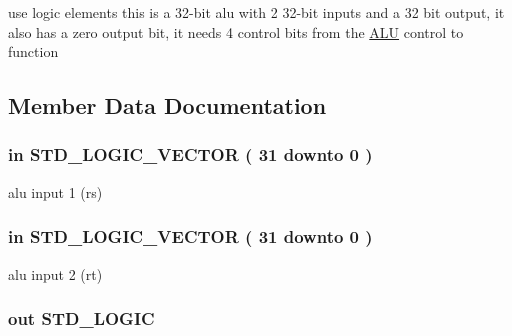 use logic elements this is a 32-\/bit alu with 2 32-\/bit inputs and a 32 bit output, it also has a zero output bit, it needs 4 control bits from the \hyperlink{class_a_l_u}{\-A\-L\-U} control to function 

\subsection{\-Member \-Data \-Documentation}
\hypertarget{class_a_l_u_ad506dc3c4d5a49b33075dcf2ea057306}{
\subsubsection[{\-A\-L\-U\-\_\-\-Input\-\_\-1}]{ {\bfseries in } {\bfseries \-S\-T\-D\-\_\-\-L\-O\-G\-I\-C\-\_\-\-V\-E\-C\-T\-O\-R (   31    downto    0  ) } }}\label{class_a_l_u_ad506dc3c4d5a49b33075dcf2ea057306}


alu input 1 (rs) 

\hypertarget{class_a_l_u_a657f38dca67063612c1c3d9327260efd}{
\subsubsection[{\-A\-L\-U\-\_\-\-Input\-\_\-2}]{ {\bfseries in } {\bfseries \-S\-T\-D\-\_\-\-L\-O\-G\-I\-C\-\_\-\-V\-E\-C\-T\-O\-R (   31    downto    0  ) } }}\label{class_a_l_u_a657f38dca67063612c1c3d9327260efd}


alu input 2 (rt) 

\hypertarget{class_a_l_u_a15e59062cfee013b791bf90106bfe0a2}{
\subsubsection[{\-A\-L\-U\-\_\-\-Zero}]{ {\bfseries out } {\bfseries \-S\-T\-D\-\_\-\-L\-O\-G\-I\-C } }}\label{class_a_l_u_a15e59062cfee013b791bf90106bfe0a2}


